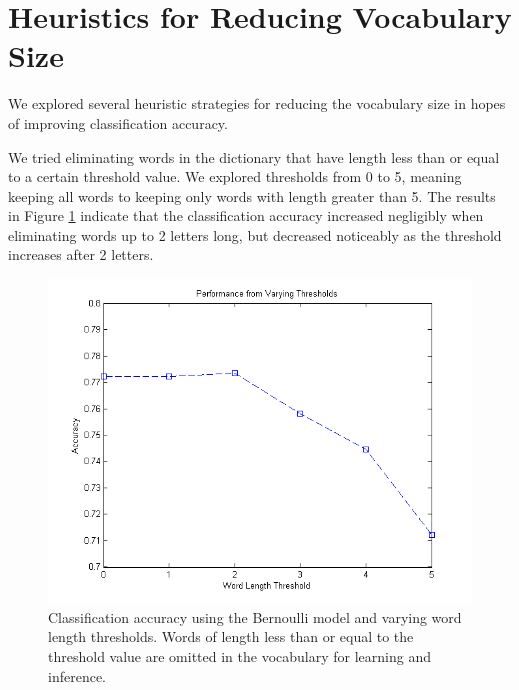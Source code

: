 \documentclass[12pt]{article}
\begin{document}
\section{Heuristics for Reducing Vocabulary Size}

We explored several heuristic strategies for reducing the vocabulary size in hopes of improving classification accuracy.

We tried eliminating words in the dictionary that have length less than  or equal to a certain threshold value. We explored thresholds from 0 to 5, meaning keeping all words to keeping only words with length greater than 5. The results in Figure \ref{fig:vocabthreshold} indicate that the classification accuracy increased negligibly when eliminating words up to 2 letters long, but decreased noticeably as the threshold increases after 2 letters.

\begin{figure}[!t]
  \centering
  \includegraphics[scale=.70]{img/vocabthreshold.png}
  \caption{Classification accuracy using the Bernoulli model and varying word length thresholds. Words of length less than or equal to the threshold value are omitted in the vocabulary for learning and inference.}
  \label{fig:vocabthreshold}
\end{figure}
\end{document}
